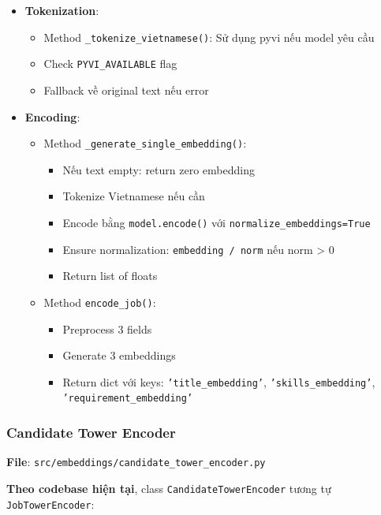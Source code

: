 \begin{itemize}
    \item \textbf{Tokenization}:
    \begin{itemize}
        \item Method \texttt{\_tokenize\_vietnamese()}: Sử dụng pyvi nếu model yêu cầu
        \item Check \texttt{PYVI\_AVAILABLE} flag
        \item Fallback về original text nếu error
    \end{itemize}
    
    \item \textbf{Encoding}:
    \begin{itemize}
        \item Method \texttt{\_generate\_single\_embedding()}: 
        \begin{itemize}
            \item Nếu text empty: return zero embedding
            \item Tokenize Vietnamese nếu cần
            \item Encode bằng \texttt{model.encode()} với \texttt{normalize\_embeddings=True}
            \item Ensure normalization: \texttt{embedding / norm} nếu norm > 0
            \item Return list of floats
        \end{itemize}
        \item Method \texttt{encode\_job()}: 
        \begin{itemize}
            \item Preprocess 3 fields
            \item Generate 3 embeddings
            \item Return dict với keys: \texttt{'title\_embedding'}, \texttt{'skills\_embedding'}, \texttt{'requirement\_embedding'}
        \end{itemize}
    \end{itemize}
\end{itemize}

\subsubsection{Candidate Tower Encoder}

\textbf{File}: \texttt{src/embeddings/candidate\_tower\_encoder.py}

\textbf{Theo codebase hiện tại}, class \texttt{CandidateTowerEncoder} tương tự \texttt{JobTowerEncoder}:

